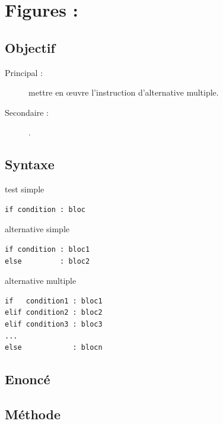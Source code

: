 \section{Figures : }

\subsection{Objectif}\label{tests:figures:objectif}
\begin{description}
\item[Principal : ] mettre en \oe uvre l'instruction d'alternative multiple.
\item[Secondaire :] .
\end{description}

\subsection{Syntaxe \python}\label{tests:figures:python}
\noindent\begin{minipage}[t]{0.3\textwidth}
test simple\footnotesize
\begin{Verbatim}
if condition : bloc
\end{Verbatim}
\end{minipage}
\hfill
\begin{minipage}[t]{0.3\textwidth}
alternative simple\footnotesize
\begin{Verbatim}
if condition : bloc1
else         : bloc2
\end{Verbatim}
\end{minipage}
\hfill
\begin{minipage}[t]{0.3\textwidth}
alternative multiple\footnotesize
\begin{Verbatim}
if   condition1 : bloc1
elif condition2 : bloc2
elif condition3 : bloc3
...
else            : blocn
\end{Verbatim}
\end{minipage}

\subsection{Enoncé}\label{tests:figures:enonce}

\subsection{Méthode}\label{tests:figures:methode}

